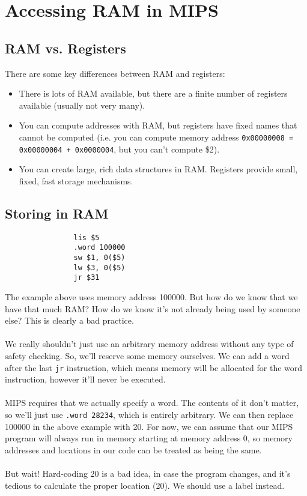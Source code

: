 \documentclass[]{article}
\theoremstyle{definition}
\begin{document}
	\section{Accessing RAM in MIPS}
		\subsection{RAM vs. Registers}
			There are some key differences between RAM and registers:
			\begin{itemize}
				\item There is lots of RAM available, but there are a finite number of registers available (usually not very many).
				\item You can compute addresses with RAM, but registers have fixed names that cannot be computed (i.e. you can compute memory address \verb|0x00000008 = 0x00000004 + 0x0000004|, but you can't compute \$2).
				\item You can create large, rich data structures in RAM. Registers provide small, fixed, fast storage mechanisms.
			\end{itemize}
		\subsection{Storing in RAM}
			\begin{verbatim}
				lis $5
				.word 100000
				sw $1, 0($5)
				lw $3, 0($5)
				jr $31
			\end{verbatim}
			
			The example above uses memory address 100000. But how do we know that we have that much RAM? How do we know it's not already being used by someone else? This is clearly a bad practice.
			\\ \\
			We really shouldn't just use an arbitrary memory address without any type of safety checking. So, we'll reserve some memory ourselves. We can add a word after the last \verb+jr+ instruction, which means memory will be allocated for the word instruction, however it'll never be executed.
			\\ \\
			MIPS requires that we actually specify a word. The contents of it don't matter, so we'll just use \verb+.word 28234+, which is entirely arbitrary. We can then replace 100000 in the above example with 20. For now, we can assume that our MIPS program will always run in memory starting at memory address 0, so memory addresses and locations in our code can be treated as being the same.
			\\ \\
			But wait! Hard-coding 20 is a bad idea, in case the program changes, and it's tedious to calculate the proper location (20). We should use a label instead.
\end{document}
